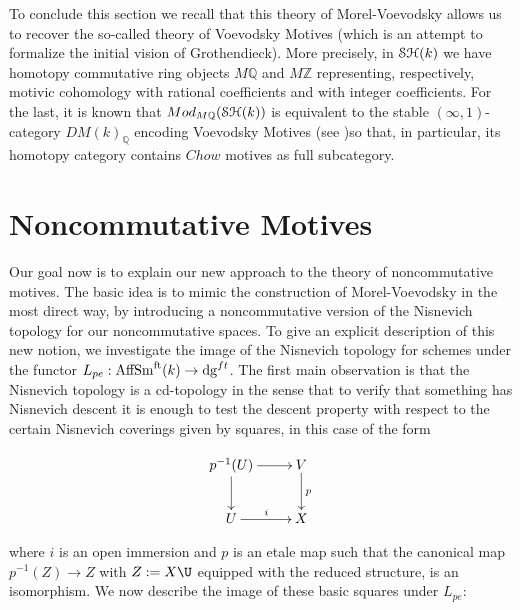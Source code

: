 \begin{refsection}
To conclude this section we recall that this theory of Morel-Voevodsky allows us to recover the so-called theory of Voevodsky Motives (which is an attempt to formalize the initial vision of Grothendieck). More precisely, in $\mathcal{S}\mathcal{H}(k)$ we have homotopy commutative ring objects $M\mathbb{Q}$ and $M\mathbb{Z}$ representing, respectively,  motivic cohomology with rational coefficients and with integer coefficients. For the last, it is known that $Mod_{M\mathbb{Q}}(\mathcal{S}\mathcal{H}(k))$ is equivalent to the stable $(\infty,1)$-category $DM(k)_{\mathbb{Q}}$ encoding Voevodsky Motives (see \cite{motiviccohomology-lectures, rodingsostaer})so that, in particular, its homotopy category contains $Chow$ motives as full subcategory.

\section{Noncommutative Motives}

Our goal now is to explain our new approach to the theory of noncommutative motives. The basic idea is to mimic the construction of Morel-Voevodsky in the most direct way, by introducing a noncommutative version of the Nisnevich topology for our noncommutative spaces. To give an explicit description of this new notion,  we investigate the image of the Nisnevich topology for schemes under the functor $L_{pe}: \mathrm{AffSm}^{\mathrm{ft}}(k)\to \mathrm{dg}^{ft}$. The first main observation is that the Nisnevich topology is a cd-topology in the sense that to verify that something has Nisnevich descent it is enough to test the descent property with respect to the certain Nisnevich coverings given by squares, in this case of the form

$$
\xymatrix{
p^{-1}(U)\ar[r]\ar[d]& V\ar[d]^{p}\\ 
U\ar[r]^i& X
}
$$ 

\noindent where $i$ is an open immersion and $p$ is an etale map such that the canonical map $p^{-1}(Z)\to Z$ with $Z:=X\U$ equipped with the reduced structure, is an isomorphism. We now describe the image of these basic squares under $L_{pe}$:


\end{refsection}
